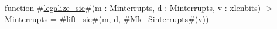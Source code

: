 function #\hyperref[sailRISCVzlegalizzezysie]{legalize\_sie}#(m : Minterrupts, d : Minterrupts, v : xlenbits) -> Minterrupts = {
  #\hyperref[sailRISCVzliftzysie]{lift\_sie}#(m, d, #\hyperref[sailRISCVzMkzySinterrupts]{Mk\_Sinterrupts}#(v))
}
